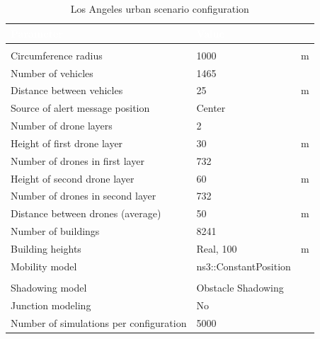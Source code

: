 	\begin{table}[H]
		\def\arraystretch{1.1}
		\begin{tabularx}{\textwidth}{l | l  l}
			\rowcolor{I} {\large \textcolor{white}{Parameter}} & {\large \textcolor{white}{Value}} & {\large \textcolor{white}{}} \TBstrut  \\
			\toprule
			\endhead
			\rowcolor{P} \multicolumn{3}{c}{Scenario configuration} \\
			\midrule[1pt]
			Circumference radius					& 1000					& m		\\
			Number of vehicles						& 1465					& 		\\
			Distance between vehicles 				& 25					& m		\\
			Source of alert message position		& Center				&		\\
			Number of drone layers					& 2						&		\\
			Height of first drone layer				& 30					& m		\\
			Number of drones in first layer			& 732					& 		\\
			Height of second drone layer			& 60					& m		\\
			Number of drones in second layer		& 732					& 		\\
			Distance between drones (average)		& 50					& m		\\
			Number of buildings						& 8241					&		\\
			Building heights						& Real, 100				& m		\\
			Mobility model							& ns3::ConstantPosition	&		\\
			\midrule[1pt]
			\rowcolor{P} \multicolumn{3}{c}{Network configuration} \\
			\midrule[1pt]
			Shadowing model							& Obstacle Shadowing 	&		\\
			Junction modeling						& No					&		\\
			\midrule[1pt]
			Number of simulations per configuration	& 5000					&		\\
			\bottomrule
		\end{tabularx}
		\caption{Los Angeles urban scenario configuration}
		\label{tab:la-smart-city}
	\end{table}


